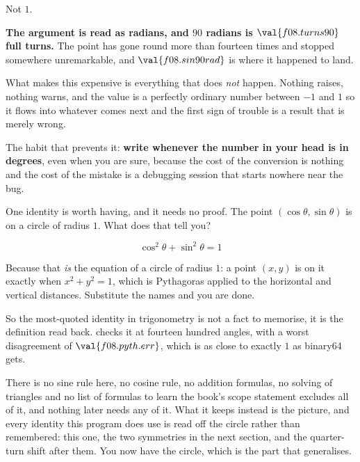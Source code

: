 \begin{fr}
Not $1$.

\begin{trapbox}
\textbf{The argument is read as radians, and $90$ radians is
$\val{f08.turns90}$ full turns.} The point has gone round more than fourteen
times and stopped somewhere unremarkable, and $\val{f08.sin90rad}$ is where it
happened to land.

What makes this expensive is everything that does \emph{not} happen. Nothing
raises, nothing warns, and the value is a perfectly ordinary number between
$-1$ and $1$ \dash{} so it flows into whatever comes next and the first sign
of trouble is a result that is merely wrong.

The habit that prevents it: \textbf{write  whenever the
number in your head is in degrees}, even when you are sure, because the cost
of the conversion is nothing and the cost of the mistake is a debugging
session that starts nowhere near the bug.
\end{trapbox}

One identity is worth having, and it needs no proof. The point $(\cos\theta,
\sin\theta)$ is on a circle of radius $1$. What does that tell you?
\nextframe
\end{fr}

\begin{fr}
\begin{ansblock}
\[ \cos^{2}\theta + \sin^{2}\theta = 1 \]
\end{ansblock}

Because that \emph{is} the equation of a circle of radius $1$: a point $(x, y)$
is on it exactly when $x^{2} + y^{2} = 1$, which is Pythagoras applied to the
horizontal and vertical distances. Substitute the names and you are done.

So the most-quoted identity in trigonometry is not a fact to memorise, it is
the definition read back.  checks it at
fourteen hundred angles, with a worst disagreement of $\val{f08.pyth.err}$,
which is as close to exactly $1$ as binary64 gets.

\begin{note}
There is no sine rule here, no cosine rule, no addition formulas, no solving
of triangles and no list of formulas to learn \dash{} the book's scope
statement excludes all of it, and nothing later needs any of it. What it keeps
instead is the picture, and every identity this program does use is read off
the circle rather than remembered: this one, the two symmetries in the next
section, and the quarter-turn shift after them. You now have the circle, which
is the part that generalises.
\end{note}
\end{fr}

